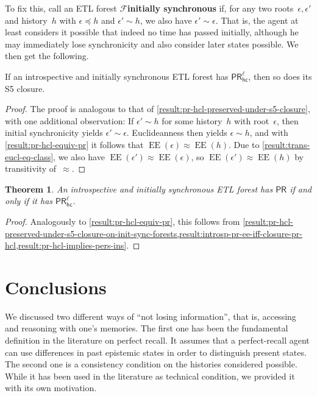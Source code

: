 \documentclass{article}
\newcommand{\PR}{\ensuremath{\mathsf{PR}}\xspace}
\newcommand{\PRhcl}{\ensuremath{\mathsf{PR_{hc}^\ell}}\xspace}
\def\dfn{\textbf}
\def\dfnless{\dfn} \def\F{\ensuremath{\mathcal{F}}\xspace}
\newcommand{\acc}{\sim}
\newcommand{\tiff}{if and only if\xspace}
\DeclareMathOperator{\EE}{EE}
\newcounter{#1}
\newtheorem{theorem}{Theorem}[section]
\begin{document}
To fix this, call an ETL forest \F \dfnless{initially synchronous} if,
for any two roots~$\epsilon,\epsilon'$ and history~$h$ with $\epsilon\preceq h$ and $\epsilon'\acc h$,
we also have $\epsilon'\acc\epsilon$.
That is, the agent at least considers it possible that indeed no time has passed initially,
although he may immediately lose synchronicity and also consider later states possible.
We then get the following.
\begin{lemma}
  \label{result:pr-hcl-preserved-under-s5-closure-on-init-sync-forests}
  If an introspective and initially synchronous ETL forest has \PRhcl, then so does its S5 closure.
\end{lemma}
\begin{proof}
  The proof is analogous to that of \cref{result:pr-hcl-preserved-under-s5-closure},
  with one additional observation:
  If $\epsilon'\acc h$ for some history~$h$ with root~$\epsilon$,
  then initial synchronicity yields $\epsilon'\acc\epsilon$.
  Euclideanness then yields $\epsilon\acc h$,
  and with \cref{result:pr-hcl-equiv-pr} it follows that $\EE(\epsilon)\approx\EE(h)$.
  Due to \cref{result:trans-eucl-eq-class}, we also have $\EE(\epsilon')\approx\EE(\epsilon)$,
  so $\EE(\epsilon')\approx\EE(h)$ by transitivity of~$\approx$.
\end{proof}

\begin{theorem}
  An introspective and initially synchronous ETL forest has \PR \tiff it has \PRhcl.
\end{theorem}
\begin{proof}
  Analogously to \cref{result:pr-hcl-equiv-pr}, this follows from
  \cref{result:pr-hcl-preserved-under-s5-closure-on-init-sync-forests,result:introsp-pr-ee-iff-closure-pr-hcl,result:pr-hcl-implies-pers-ins}.
\end{proof}

\section{Conclusions}
\label{sec:conclusions}

We discussed two different ways of ``not losing information'', that is,
accessing and reasoning with one's memories.
The first one has been the fundamental definition in the literature on perfect recall.
It assumes that a perfect-recall agent can use differences in past epistemic states
in order to distinguish present states.
The second one is a consistency condition on the histories considered possible.
While it has been used in the literature as technical condition,
we provided it with its own motivation.
\end{document}

